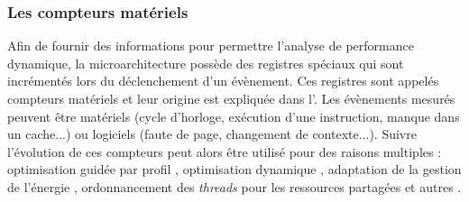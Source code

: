 

    \subsubsection{Les compteurs matériels}
 
        Afin de fournir des informations pour permettre l'analyse de performance dynamique, la microarchitecture possède des registres spéciaux qui sont incrémentés lors du déclenchement d'un évènement. Ces registres sont appelés compteurs matériels et leur origine est expliquée dans l'. Les évènements mesurés peuvent être matériels (cycle d'horloge, exécution d'une instruction, manque dans un cache...) ou logiciels (faute de page, changement de contexte...). Suivre l'évolution de ces compteurs peut alors être utilisé pour des raisons multiples \cite{Moseley2011} : optimisation guidée par profil \cite{Cavazos2006}, optimisation dynamique \cite{Dai2005}, adaptation de la gestion de l'énergie \cite{Isci2005}, ordonnancement des \textit{threads} pour les ressources partagées \cite{Moseley2006} et autres \cite{Shye2005, Shye2008}.
        
